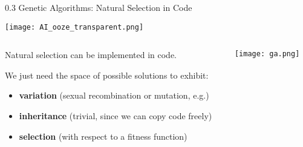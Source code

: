 \documentclass[9pt]{beamer}
\begin{document}
\begin{frame}{0.3 Genetic Algorithms: Natural Selection in Code}
  \begin{center}
    \texttt{[image: AI\_ooze\_transparent.png]}
    \end{center}
  \begin{columns}
  
  \begin{column}{0.5\textwidth}

Natural selection can be implemented in code. 

We just need the space of possible solutions to exhibit:
  \begin{itemize}
  \item \textbf{variation} (sexual recombination or mutation, e.g.)
  \item \textbf{inheritance} (trivial, since we can copy code freely)
  \item \textbf{selection} (with respect to a fitness function)
  \end{itemize}
  
  
  
  \end{column}
  
  \begin{column}{0.5\textwidth}
    \texttt{[image: ga.png]}

  
  \end{column}
  \end{columns}

   

\end{frame}
\end{document}
